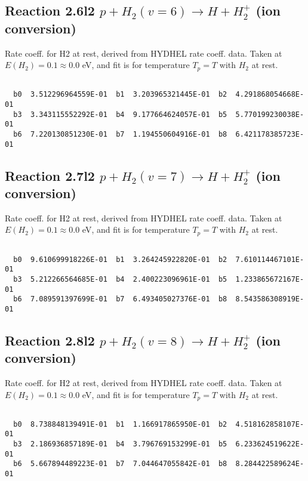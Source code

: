 \newpage
\subsection{
Reaction 2.6l2
$ p + H_2(v=6) \rightarrow H + H_2^+$ (ion conversion)
}
Rate coeff. for H2 at rest, derived from HYDHEL rate coeff. data.
Taken at $E(H_2) = 0.1 \approx 0.0$ eV,  and fit is for temperature $T_p=T$ with $H_2$ at rest.

\begin{small}\begin{verbatim}

  b0  3.512296964559E-01  b1  3.203965321445E-01  b2  4.291868054668E-01
  b3  3.343115552292E-01  b4  9.177664624057E-01  b5  5.770199230038E-01
  b6  7.220130851230E-01  b7  1.194550604916E-01  b8  6.421178385723E-01

\end{verbatim}\end{small}

\newpage
\subsection{
Reaction 2.7l2
$ p + H_2(v=7) \rightarrow H + H_2^+$ (ion conversion)
}
Rate coeff. for H2 at rest, derived from HYDHEL rate coeff. data.
Taken at $E(H_2) = 0.1 \approx 0.0$ eV,  and fit is for temperature $T_p=T$ with $H_2$ at rest.

\begin{small}\begin{verbatim}

  b0  9.610699918226E-01  b1  3.264245922820E-01  b2  7.610114467101E-01
  b3  5.212266564685E-01  b4  2.400223096961E-01  b5  1.233865672167E-01
  b6  7.089591397699E-01  b7  6.493405027376E-01  b8  8.543586308919E-01

\end{verbatim}\end{small}

\newpage
\subsection{
Reaction 2.8l2
$ p + H_2(v=8) \rightarrow H + H_2^+$ (ion conversion)
}
Rate coeff. for H2 at rest, derived from HYDHEL rate coeff. data.
Taken at $E(H_2) = 0.1 \approx 0.0$ eV,  and fit is for temperature $T_p=T$ with $H_2$ at rest.

\begin{small}\begin{verbatim}

  b0  8.738848139491E-01  b1  1.166917865950E-01  b2  4.518162858107E-01
  b3  2.186936857189E-01  b4  3.796769153299E-01  b5  6.233624519622E-01
  b6  5.667894489223E-01  b7  7.044647055842E-01  b8  8.284422589624E-01

\end{verbatim}\end{small}

